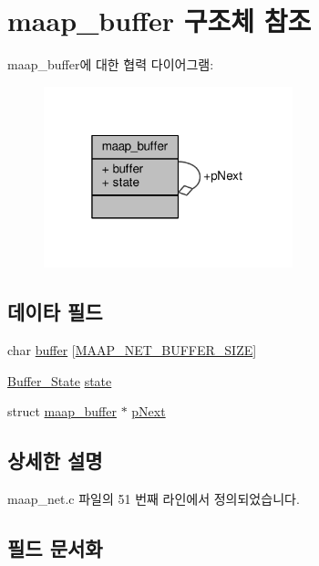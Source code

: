 \hypertarget{structmaap__buffer}{}\section{maap\+\_\+buffer 구조체 참조}
\label{structmaap__buffer}


maap\+\_\+buffer에 대한 협력 다이어그램\+:
\nopagebreak
\begin{figure}[H]
\begin{center}
\leavevmode
\includegraphics[width=205pt]{structmaap__buffer__coll__graph}
\end{center}
\end{figure}
\subsection*{데이타 필드}
\begin{DoxyCompactItemize}
\item 
char \hyperlink{structmaap__buffer_a9c2256b187e4a46b704abb242b5e3b2e}{buffer} \mbox{[}\hyperlink{maap__net_8h_a7201d613d0bf5b69e51304c574a77022}{M\+A\+A\+P\+\_\+\+N\+E\+T\+\_\+\+B\+U\+F\+F\+E\+R\+\_\+\+S\+I\+ZE}\mbox{]}
\item 
\hyperlink{maap__net_8c_a14e4deee8c18a7b937b67c06a6d26b7e}{Buffer\+\_\+\+State} \hyperlink{structmaap__buffer_a34e24239a3e8e82b98201f72b2b592a5}{state}
\item 
struct \hyperlink{structmaap__buffer}{maap\+\_\+buffer} $\ast$ \hyperlink{structmaap__buffer_a8825d59fa94e1070c0591d6328f1362c}{p\+Next}
\end{DoxyCompactItemize}


\subsection{상세한 설명}


maap\+\_\+net.\+c 파일의 51 번째 라인에서 정의되었습니다.



\subsection{필드 문서화}
